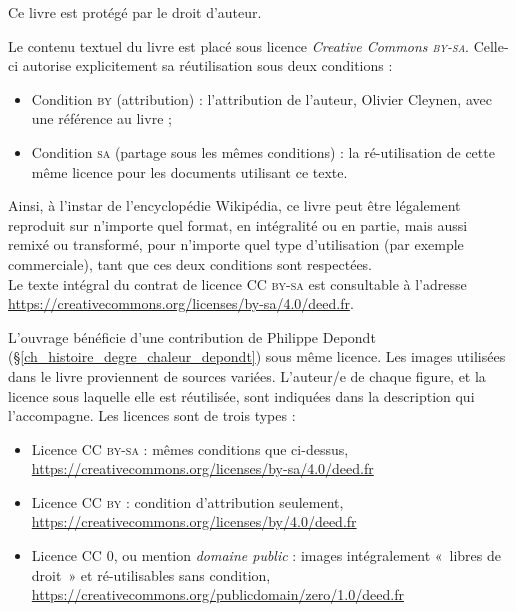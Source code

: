{\setlength{\parindent}{0pt}
	Ce livre est protégé par le droit d’auteur.

	Le contenu textuel du livre est placé sous licence \textit{Creative Commons \textsc{by-sa}}. Celle-ci autorise explicitement sa réutilisation sous deux conditions : 
	\begin{itemize}
		\renewcommand\labelitemi{\ccAttribution}
		\item Condition \textsc{by} (attribution) : l’attribution de l’auteur, Olivier Cleynen, avec une référence au livre ;
		\renewcommand\labelitemi{\ccShareAlike}
		\item Condition \textsc{sa} (partage sous les mêmes conditions) : la ré-utilisation de cette même licence pour les documents utilisant ce texte.
	\end{itemize}

	Ainsi, à l’instar de l’encyclopédie Wikipédia, ce livre peut être légalement reproduit sur n’importe quel format, en intégralité ou en partie, mais aussi remixé ou transformé, pour n’importe quel type d’utilisation (par exemple commerciale), tant que ces deux conditions sont respectées.\\
	Le texte intégral du contrat de licence \textsc{CC by-sa} est consultable à l’adresse \onlyamphibook{\\}\href{https://creativecommons.org/licenses/by-sa/4.0/deed.fr}{https://creativecommons.org/licenses/by-sa/4.0/deed.fr}.

	L’ouvrage bénéficie d’une contribution de Philippe Depondt (\S\ref{ch_histoire_degre_chaleur_depondt}) sous même licence. Les images utilisées dans le livre proviennent de sources variées. L’auteur/e de chaque figure, et la licence sous laquelle elle est réutilisée, sont indiquées dans la description qui l’accompagne. Les licences sont de trois types : 
	\begin{itemize}
		\item Licence \textsc{CC by-sa} : mêmes conditions que ci-dessus,\\
					\href{https://creativecommons.org/licenses/by-sa/4.0/deed.fr}{https://creativecommons.org/licenses/by-sa/4.0/deed.fr}
		\item Licence \textsc{CC by} : condition d’attribution seulement,\\
					\href{https://creativecommons.org/licenses/by/4.0/deed.fr}{https://creativecommons.org/licenses/by/4.0/deed.fr}
		\item Licence \textsc{CC 0}, ou mention \textit{domaine public} : images intégralement «~libres de droit~» et ré-utilisables sans condition,\\
					\href{https://creativecommons.org/publicdomain/zero/1.0/deed.fr}{https://creativecommons.org/publicdomain/zero/1.0/deed.fr}
	\end{itemize}

}
